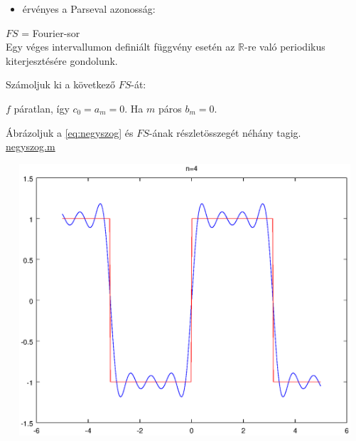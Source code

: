 \begin{spacing}{1.3}
\begin{itemize}
\item érvényes a Parseval azonosság:
\end{itemize}


$FS$ = Fourier-sor\\

 Egy véges intervallumon definiált függvény esetén 
az $\mathbb{R}$-re való periodikus kiterjesztésére gondolunk.

\newline

 Számoljuk ki a következő \fv{}$FS$-át:

$f$ páratlan, így $c_{0}=a_{m}=0$. 
Ha $m$ páros $b_{m}=0$.

 Ábrázoljuk a \eqref{eq:negyszog}  és $FS$-ának részletösszegét néhány tagig.\\
\href{M/negyszog.m}{negyszog.m}
\begin{center}
\includegraphics[width=20cm,height=10.1cm]{M/negyszog.eps}
\end{center}



\end{spacing}
